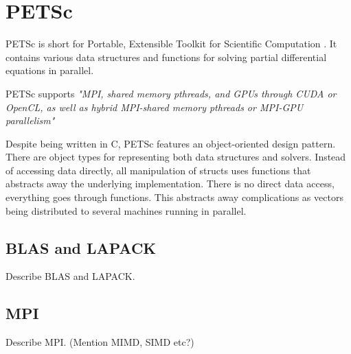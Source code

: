\section{PETSc}

PETSc is short for Portable, Extensible Toolkit for Scientific Computation 
\cite{petsc-web-page}. It contains various data structures and functions for 
solving partial differential equations in parallel. 

PETSc supports \emph{"MPI, shared memory pthreads, and GPUs through CUDA or OpenCL, as 
well as hybrid MPI-shared memory pthreads or MPI-GPU parallelism"}\cite{petsc-web-page}

Despite being written in C, PETSc features an object-oriented design pattern.
There are object types for representing both data structures and solvers.
Instead of accessing data directly, all manipulation of structs uses functions
that abstracts away the underlying implementation. There is no direct data
access, everything goes through functions. This abstracts away complications as 
vectors being distributed to several machines running in parallel.

\subsection{BLAS and LAPACK}

Describe BLAS and LAPACK.

\subsection{MPI}

Describe MPI. (Mention MIMD, SIMD etc?)

